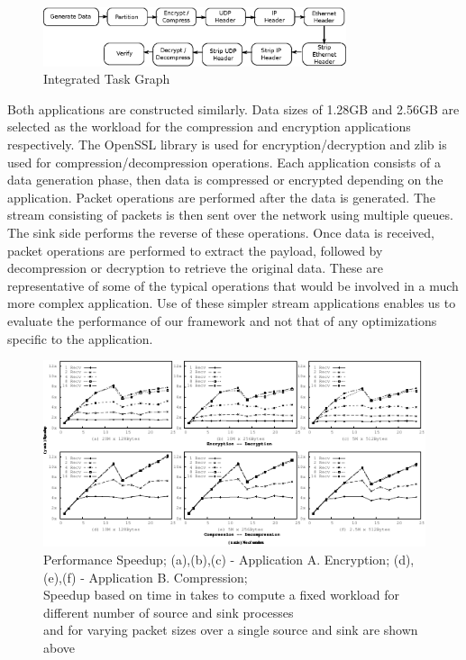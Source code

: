 \documentclass[10pt, conference, compsocconf, reqno]{IEEEtran}
\newcommand{\comment}[1]{}
\begin{document}
\begin{figure}[htb]
\centering
\includegraphics[width=3.5in]{enc-dec}
\caption{ Integrated Task Graph  }
\label{fig-app-graph}
\end{figure}

Both applications are constructed similarly. Data sizes of 1.28GB and 2.56GB are selected as the workload for the compression and encryption applications respectively. The OpenSSL library is used for encryption/decryption and zlib is used for compression/decompression operations. Each application consists of a data generation phase, then data is compressed or encrypted depending on the application. Packet operations are performed after the data is generated. The stream consisting of packets is then sent over the network using multiple queues. The sink side performs the reverse of these operations. Once data is received, packet operations are performed to extract the payload, followed by decompression or decryption to retrieve the original data. These are representative of some of the typical operations that would be involved in a much more complex application. \comment{Choosing to compare these simple operations avoids any extraneous factors that may be present in a more complex application.}Use of these simpler stream applications enables us to evaluate the performance of our framework and not that of any optimizations specific to the application.

\begin{figure}[tb]
\centering
\includegraphics[width=7in]{result}
\caption{Performance Speedup; (a),(b),(c) - Application A. Encryption; (d),(e),(f) - Application B. Compression;\\ \newline Speedup based on time in takes to compute a fixed workload for different number of source and sink processes\\ \newline and for varying packet sizes over a single source and sink are shown above}
\label{fig-res}
\end{figure}
\end{document}
